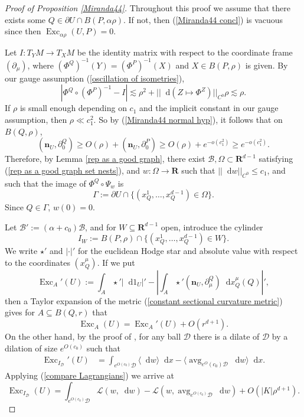 \documentclass[reqno,11pt]{amsart}
\newcommand{\RR}{\mathbf{R}}
\DeclareMathOperator{\avg}{avg}
\DeclareMathOperator{\Exc}{Exc}
\newcommand*\dif{\mathop{}\!\mathrm{d}}
\newcommand{\Lagrange}{\mathscr L}
\newcommand{\normal}{\mathbf n}
\theoremstyle{definition}
\numberwithin{equation}{section}
\begin{document}
\begin{proof}[Proof of Proposition \ref{Miranda44}]
Throughout this proof we assume that there exists some $Q \in \partial U \cap B(P, \alpha \rho)$.
If not, then (\ref{Miranda44 concl}) is vacuous since then $\Exc_{\alpha \rho} (U, P) = 0$.

Let $I: T_YM \to T_XM$ be the identity matrix with respect to the coordinate frame $(\partial_\mu)$, where $(\Phi^Q)^{-1}(Y) = (\Phi^P)^{-1}(X)$ and $X \in B(P, \rho)$ is given.
By our gauge assumption (\ref{oscillation of isometries}),
$$|\Phi^Q \circ (\Phi^P)^{-1} - I| \lesssim \rho^2 + ||\dif(Z \mapsto \Phi^Z)||_{C^0} \rho \lesssim \rho.$$
If $\rho$ is small enough depending on $c_1$ and the implicit constant in our gauge assumption, then $\rho \ll c_1^2$.
So by (\ref{Miranda44 normal hyp}), it follows that on $B(Q, \rho)$,
$$(\normal_U, \partial^Q_0) \geq O(\rho) + (\normal_U, \partial^P_0) \geq O(\rho) + e^{-o(c_1^2)} \geq e^{-o(c_1^2)}.$$
Therefore, by Lemma \ref{rep as a good graph},
there exist $\mathscr B, \Omega \subset \RR^{d - 1}$ satisfying (\ref{rep as a good graph set nests}), and $w: \Omega \to \RR$ such that $||\dif w||_{C^0} \leq c_1$, and such that the image of $\Phi^Q \circ \Psi_w$ is
$$\Gamma := \partial U \cap \{(x_Q^1, \dots, x_Q^{d - 1}) \in \Omega\}.$$
Since $Q \in \Gamma$, $w(0) = 0$.

Let $\mathscr B' := (\alpha + c_0) \mathscr B$, and for $W \subseteq \RR^{d - 1}$ open, introduce the cylinder
$$I_W := B(P, \rho) \cap \{(x^1_Q, \dots, x^{d - 1}_Q) \in W\}.$$
We write $\star'$ and $|\cdot|'$ for the euclidean Hodge star and absolute value with respect to the coordinates $(x^\mu_Q)$.
If we put
$$\Exc_A'(U) := \int_A \star' |\dif 1_U|' - \left|\int_A \star' (\normal_U, \partial^Q_\mu) \dif x^\mu_Q(Q)\right|',$$
then a Taylor expansion of the metric (\ref{constant sectional curvature metric}) gives for $A \subseteq B(Q, r)$ that
$$\Exc_A(U) = \Exc_A'(U) + O(r^{d + 1}).$$
On the other hand, by the proof of \cite[Lemma 6.4]{Giusti77}, for any ball $\mathscr D$ there is a dilate of $\mathscr D$ by a dilation of size $e^{O(c_0)}$ such that
\begin{align*}
\Exc_{I_{\mathscr D}}'(U) &= \int_{e^{O(c_0)} \mathscr D} \langle \dif w\rangle \dif x - \langle \avg_{e^O(c_0) \mathscr D} \dif w\rangle \dif x.
\end{align*}
Applying (\ref{compare Lagrangians}) we arrive at
\begin{equation}\label{excess versus lagrangian}
\Exc_{I_{\mathscr D}}(U) = \int_{e^{O(c_0)} \mathscr D} \Lagrange(w, \dif w) - \Lagrange(w, \avg_{e^{O(c_0)} \mathscr D} \dif w) + O(|K| \rho^{d + 1}).
\end{equation}


\end{proof}
\end{document}
